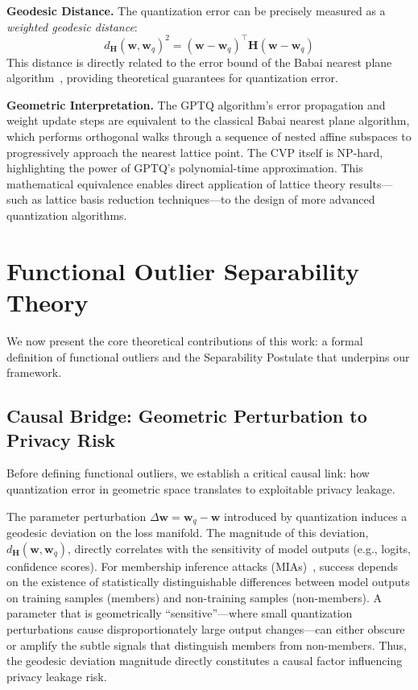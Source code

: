 \documentclass[letterpaper,twocolumn,10pt]{article}
\begin{document}
\textbf{Geodesic Distance.} The quantization error can be precisely measured as a \emph{weighted geodesic distance}:
\begin{equation}
d_{\mathbf{H}}(\mathbf{w}, \mathbf{w}_q)^2 = (\mathbf{w} - \mathbf{w}_q)^\top \mathbf{H} (\mathbf{w} - \mathbf{w}_q)
\label{eq:geodesic_distance}
\end{equation}
This distance is directly related to the error bound of the Babai nearest plane algorithm~\cite{agrell2023lattice}, providing theoretical guarantees for quantization error.

\textbf{Geometric Interpretation.} The GPTQ algorithm's error propagation and weight update steps are equivalent to the classical Babai nearest plane algorithm, which performs orthogonal walks through a sequence of nested affine subspaces to progressively approach the nearest lattice point. The CVP itself is NP-hard, highlighting the power of GPTQ's polynomial-time approximation. This mathematical equivalence enables direct application of lattice theory results---such as lattice basis reduction techniques---to the design of more advanced quantization algorithms.

\section{Functional Outlier Separability Theory}
\label{sec:theory}

We now present the core theoretical contributions of this work: a formal definition of functional outliers and the Separability Postulate that underpins our framework.

\subsection{Causal Bridge: Geometric Perturbation to Privacy Risk}

Before defining functional outliers, we establish a critical causal link: how quantization error in geometric space translates to exploitable privacy leakage.

The parameter perturbation $\Delta \mathbf{w} = \mathbf{w}_q - \mathbf{w}$ introduced by quantization induces a geodesic deviation on the loss manifold. The magnitude of this deviation, $d_{\mathbf{H}}(\mathbf{w}, \mathbf{w}_q)$, directly correlates with the sensitivity of model outputs (e.g., logits, confidence scores). For membership inference attacks (MIAs)~\cite{shokri2017membership}, success depends on the existence of statistically distinguishable differences between model outputs on training samples (members) and non-training samples (non-members). A parameter that is geometrically ``sensitive''---where small quantization perturbations cause disproportionately large output changes---can either obscure or amplify the subtle signals that distinguish members from non-members. Thus, the geodesic deviation magnitude directly constitutes a causal factor influencing privacy leakage risk.
\end{document}
